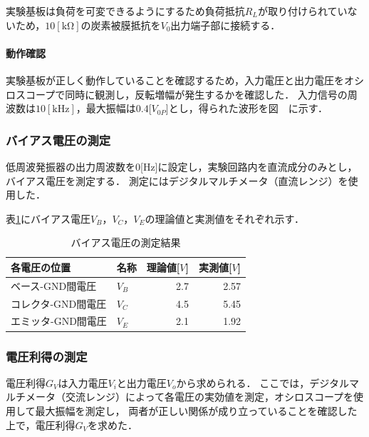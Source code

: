 \documentclass[dvipdfmx,titlepage,a4j]{jsarticle}  %
\numberwithin{equation}{section}
\begin{document}
実験基板は負荷を可変できるようにするため負荷抵抗$R_L$が取り付けられていないため，$10 \mathrm{[k\Omega]}$の炭素被膜抵抗を$V_0$出力端子部に接続する．

\paragraph{動作確認}
実験基板が正しく動作していることを確認するため，入力電圧と出力電圧をオシロスコープで同時に観測し，反転増幅が発生するかを確認した．
入力信号の周波数は$10 \mathrm{[kHz]}$，最大振幅は$0.4$[$V_{0P}$]とし，得られた波形を図　に示す．

\subsubsection{バイアス電圧の測定}
低周波発振器の出力周波数を0[Hz]に設定し，実験回路内を直流成分のみとし，バイアス電圧を測定する．
測定にはデジタルマルチメータ（直流レンジ）を使用した．

表\ref{tbl:res;bias}にバイアス電圧$V_B$，$V_C$，$V_E$の理論値と実測値をそれぞれ示す．
\begin{table}[H]
  \caption{バイアス電圧の測定結果}
  \begin{center}
    \begin{tabular}{l|l|r|r}
      \hline
      各電圧の位置       & 名称  & \multicolumn{1}{l|}{理論値[$V$]} & \multicolumn{1}{l}{実測値[$V$]} \\ \hline\hline
      ベース-GND間電圧   & $V_B$ & 2.7                              & 2.57                            \\ \hline
      コレクタ-GND間電圧 & $V_C$ & 4.5                              & 5.45                            \\ \hline
      エミッタ-GND間電圧 & $V_E$ & 2.1                              & 1.92                            \\ \hline
    \end{tabular}
  \end{center}
  \label{tbl:res;bias}
\end{table}

\subsubsection{電圧利得の測定}
電圧利得$G_V$は入力電圧$V_i$と出力電圧$V_o$から求められる．
ここでは，デジタルマルチメータ（交流レンジ）によって各電圧の実効値を測定，オシロスコープを使用して最大振幅を測定し，
両者が正しい関係が成り立っていることを確認した上で，電圧利得$G_V$を求めた．
\end{document}
